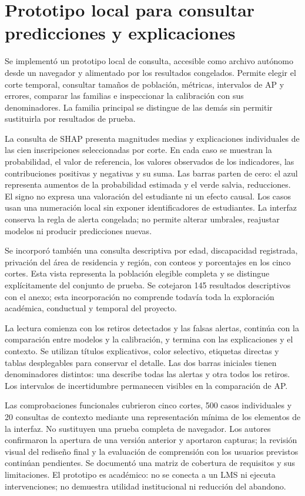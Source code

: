 \label{editorial:prototipo}
\section{Prototipo local para consultar predicciones y explicaciones}
Se implementó un prototipo local de consulta, accesible como archivo autónomo desde un navegador y alimentado por los resultados congelados. Permite elegir el corte temporal, consultar tamaños de población, métricas, intervalos de AP y errores, comparar las familias e inspeccionar la calibración con sus denominadores. La familia principal se distingue de las demás sin permitir sustituirla por resultados de prueba.

La consulta de SHAP presenta magnitudes medias y explicaciones individuales de las cien inscripciones seleccionadas por corte. En cada caso se muestran la probabilidad, el valor de referencia, los valores observados de los indicadores, las contribuciones positivas y negativas y su suma. Las barras parten de cero: el azul representa aumentos de la probabilidad estimada y el verde salvia, reducciones. El signo no expresa una valoración del estudiante ni un efecto causal. Los casos usan una numeración local sin exponer identificadores de estudiantes. La interfaz conserva la regla de alerta congelada; no permite alterar umbrales, reajustar modelos ni producir predicciones nuevas.

Se incorporó también una consulta descriptiva por edad, discapacidad registrada, privación del área de residencia y región, con conteos y porcentajes en los cinco cortes. Esta vista representa la población elegible completa y se distingue explícitamente del conjunto de prueba. Se cotejaron 145 resultados descriptivos con el anexo; esta incorporación no comprende todavía toda la exploración académica, conductual y temporal del proyecto.

La lectura comienza con los retiros detectados y las falsas alertas, continúa con la comparación entre modelos y la calibración, y termina con las explicaciones y el contexto. Se utilizan títulos explicativos, color selectivo, etiquetas directas y tablas desplegables para conservar el detalle. Las dos barras iniciales tienen denominadores distintos: una describe todas las alertas y otra todos los retiros. Los intervalos de incertidumbre permanecen visibles en la comparación de AP.

Las comprobaciones funcionales cubrieron cinco cortes, 500 casos individuales y 20 consultas de contexto mediante una representación mínima de los elementos de la interfaz. No sustituyen una prueba completa de navegador. Los autores confirmaron la apertura de una versión anterior y aportaron capturas; la revisión visual del rediseño final y la evaluación de comprensión con los usuarios previstos continúan pendientes. Se documentó una matriz de cobertura de requisitos y sus limitaciones. El prototipo es académico: no se conecta a un LMS ni ejecuta intervenciones; no demuestra utilidad institucional ni reducción del abandono.

